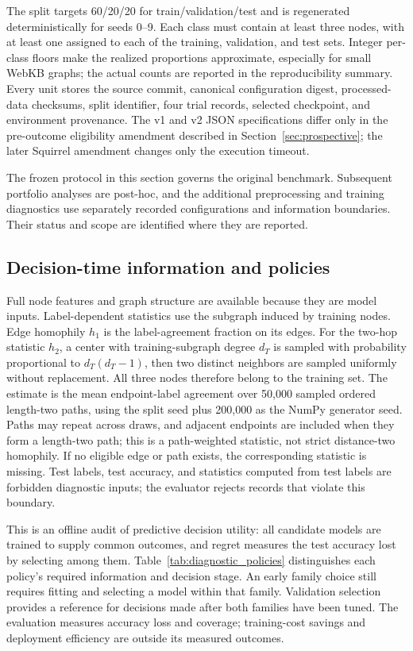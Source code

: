 The split targets 60/20/20 for train/validation/test and is regenerated deterministically for seeds 0--9. Each class must contain at least three nodes, with at least one assigned to each of the training, validation, and test sets. Integer per-class floors make the realized proportions approximate, especially for small WebKB graphs; the actual counts are reported in the reproducibility summary. Every unit stores the source commit, canonical configuration digest, processed-data checksums, split identifier, four trial records, selected checkpoint, and environment provenance. The v1 and v2 JSON specifications differ only in the pre-outcome eligibility amendment described in Section~\ref{sec:prospective}; the later Squirrel amendment changes only the execution timeout.

The frozen protocol in this section governs the original benchmark. Subsequent portfolio analyses are post-hoc, and the additional preprocessing and training diagnostics use separately recorded configurations and information boundaries. Their status and scope are identified where they are reported.

\subsection{Decision-time information and policies}

Full node features and graph structure are available because they are model inputs. Label-dependent statistics use the subgraph induced by training nodes. Edge homophily $h_1$ is the label-agreement fraction on its edges. For the two-hop statistic $h_2$, a center with training-subgraph degree $d_T$ is sampled with probability proportional to $d_T(d_T-1)$, then two distinct neighbors are sampled uniformly without replacement. All three nodes therefore belong to the training set. The estimate is the mean endpoint-label agreement over 50,000 sampled ordered length-two paths, using the split seed plus 200,000 as the NumPy generator seed. Paths may repeat across draws, and adjacent endpoints are included when they form a length-two path; this is a path-weighted statistic, not strict distance-two homophily. If no eligible edge or path exists, the corresponding statistic is missing. Test labels, test accuracy, and statistics computed from test labels are forbidden diagnostic inputs; the evaluator rejects records that violate this boundary.

This is an offline audit of predictive decision utility: all candidate models are trained to supply common outcomes, and regret measures the test accuracy lost by selecting among them. Table~\ref{tab:diagnostic_policies} distinguishes each policy's required information and decision stage. An early family choice still requires fitting and selecting a model within that family. Validation selection provides a reference for decisions made after both families have been tuned. The evaluation measures accuracy loss and coverage; training-cost savings and deployment efficiency are outside its measured outcomes.

